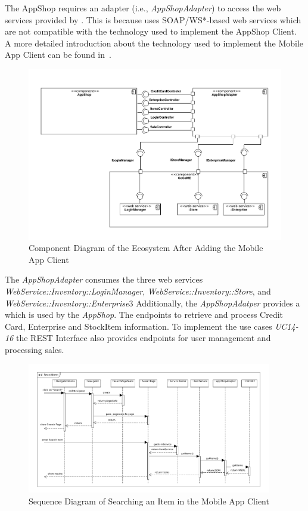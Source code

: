 The AppShop requires an adapter (i.e., \textit{AppShopAdapter}) to access the web services provided by \CoCoME. %
This is because \CoCoME uses SOAP/WS*-based web services which are not compatible with the technology used to implement the AppShop Client. 
A more detailed introduction about the technology used to implement the Mobile App Client can be found in~\cite{schnabel}. 
  
 \begin{figure}[!h]
	\includegraphics[width=\textwidth]{img/appComponent.pdf}
	\caption{Component Diagram of the \CoCoME Ecosystem After Adding the Mobile App Client}
	\label{ComponentApp}
\end{figure}

The \textit{AppShopAdapter} consumes the three web services \textit{WebService::Inventory::LoginManager}, \textit{WebService::Inventory::Store}, and \textit{WebService::Inventory::Enterprise}3
Additionally, the \textit{AppShopAdatper} provides a   which is used by the \textit{AppShop}. 
The   endpoints to retrieve and process Credit Card, Enterprise and StockItem information. 
To implement the use cases \emph{UC14-16} the REST Interface also provides endpoints for user management and processing sales. 
  
\begin{figure}[!h]
	\includegraphics[width=0.95\textwidth]{img/appSearchSequence.pdf}
	\caption{Sequence Diagram of Searching an Item in the Mobile App Client}
	\label{SequenceAppSearch}
\end{figure}

